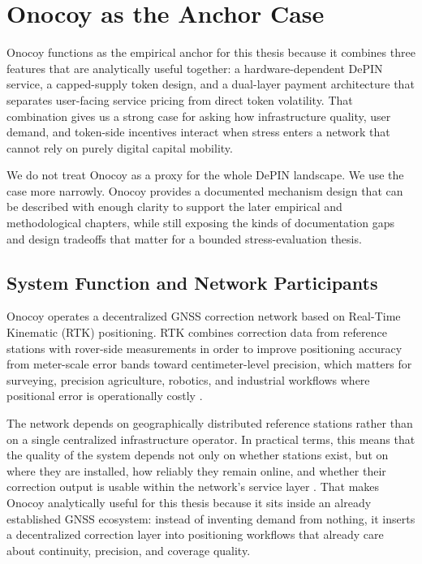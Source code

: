 \section{Onocoy as the Anchor Case}
\label{sec:onocoy_anchor_case}

Onocoy functions as the empirical anchor for this thesis because it combines three features that are analytically useful together: a hardware-dependent DePIN service, a capped-supply token design, and a dual-layer payment architecture that separates user-facing service pricing from direct token volatility. That combination gives us a strong case for asking how infrastructure quality, user demand, and token-side incentives interact when stress enters a network that cannot rely on purely digital capital mobility.

We do not treat Onocoy as a proxy for the whole DePIN landscape. We use the case more narrowly. Onocoy provides a documented mechanism design that can be described with enough clarity to support the later empirical and methodological chapters, while still exposing the kinds of documentation gaps and design tradeoffs that matter for a bounded stress-evaluation thesis.

\subsection{System Function and Network Participants}
Onocoy operates a decentralized GNSS correction network based on Real-Time Kinematic (RTK) positioning. RTK combines correction data from reference stations with rover-side measurements in order to improve positioning accuracy from meter-scale error bands toward centimeter-level precision, which matters for surveying, precision agriculture, robotics, and industrial workflows where positional error is operationally costly \cite{OnocoyWhitepaper301}.

The network depends on geographically distributed reference stations rather than on a single centralized infrastructure operator. In practical terms, this means that the quality of the system depends not only on whether stations exist, but on where they are installed, how reliably they remain online, and whether their correction output is usable within the network's service layer \cite{OnocoyWhitepaper301}. That makes Onocoy analytically useful for this thesis because it sits inside an already established GNSS ecosystem: instead of inventing demand from nothing, it inserts a decentralized correction layer into positioning workflows that already care about continuity, precision, and coverage quality.

